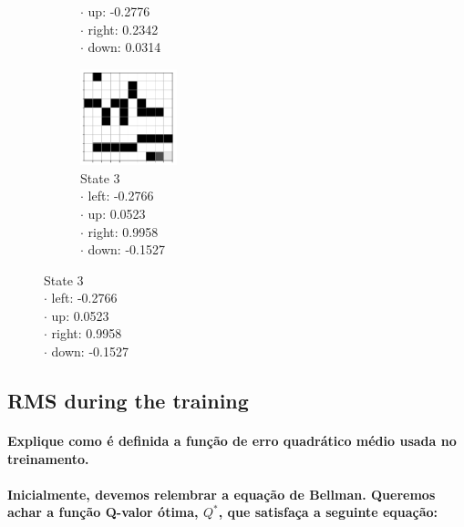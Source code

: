 \documentclass[a4paper]{article}    %
\begin{document}
\begin{figure}[H]
\begin{subfigure}{0.24\textwidth}
{            \hspace*{5mm} $\boldsymbol{\cdot}$ up:    -0.2776 \\
            \hspace*{5mm} $\boldsymbol{\cdot}$ right:  0.2342 \\
            \hspace*{5mm} $\boldsymbol{\cdot}$ down:   0.0314 }
        \label{fig:maze2-case2-state2}
    \end{subfigure}
    \hfill
    \begin{subfigure}{0.24\textwidth}
        \centering
        \includegraphics[width=2.8cm]{maze2-case2-state3}
        \caption{State 3 \\
            \scriptsize
            \hspace*{5mm} $\boldsymbol{\cdot}$ left:  -0.2766 \\
            \hspace*{5mm} $\boldsymbol{\cdot}$ up:     0.0523 \\
            \hspace*{5mm} $\boldsymbol{\cdot}$ right:  0.9958 \\
            \hspace*{5mm} $\boldsymbol{\cdot}$ down:  -0.1527 }
        \label{fig:maze2-case2-state3}
    \end{subfigure}
\end{figure}

\newpage
\subsection{RMS during the training}

\paragraph{Explique como é definida a função de erro quadrático médio usada no treinamento.}

\paragraph{Inicialmente, devemos relembrar a equação de Bellman. Queremos achar a função Q-valor ótima, $Q^*$, que satisfaça a seguinte equação:}
\end{document}
